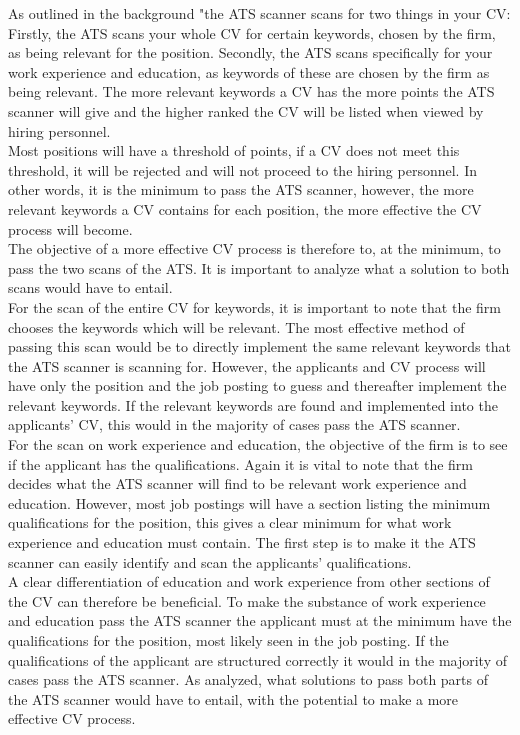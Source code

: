 As outlined in the background "the ATS scanner scans for two things in your CV:
Firstly, the ATS scans your whole CV for certain keywords, chosen by the firm, as being relevant for the position.
Secondly, the ATS scans specifically for your work experience and education, 
as keywords of these are chosen by the firm as being relevant. 
The more relevant keywords a CV has the more points the ATS scanner will give and the higher ranked the CV will be listed when viewed by hiring personnel. \\

Most positions will have a threshold of points, if a CV does not meet this threshold, 
it will be rejected and will not proceed to the hiring personnel.
In other words, it is the minimum to pass the ATS scanner, however, the more relevant keywords a CV contains for each position, 
the more effective the CV process will become. \\

The objective of a more effective CV process is therefore to, at the minimum, to pass the two scans of the ATS.
It is important to analyze what a solution to both scans would have to entail. \\
For the scan of the entire CV for keywords, it is important to note that the firm chooses the keywords which will be relevant.
The most effective method of passing this scan would be to directly implement the same relevant keywords that the ATS scanner is scanning for.
However, the applicants and CV process will have only the position and the job posting to guess and thereafter implement the relevant keywords.
If the relevant keywords are found and implemented into the applicants' CV, this would in the majority of cases pass the ATS scanner. \\

For the scan on work experience and education, the objective of the firm is to see if the applicant has the qualifications.
Again it is vital to note that the firm decides what the ATS scanner will find to be relevant work experience and education.
However, most job postings will have a section listing the minimum qualifications for the position, this gives a clear minimum for what work experience and education must contain.
The first step is to make it the ATS scanner can easily identify and scan the applicants' qualifications. \\

A clear differentiation of education and work experience from other sections of the CV can therefore be beneficial.
To make the substance of work experience and education pass the ATS scanner the applicant must at the minimum have the qualifications for the position, most likely seen in the job posting.
If the qualifications of the applicant are structured correctly it would in the majority of cases pass the ATS scanner.
As analyzed, what solutions to pass both parts of the ATS scanner would have to entail, with the potential to make a more effective CV process. \\
\clearpage